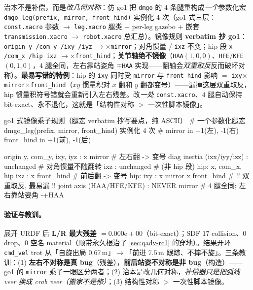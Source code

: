\begin{insight}\label{ins:qadv-leg-macro}
治本不是补偿，而是\emph{改几何对称}：仿 go1 把 \texttt{dmgo} 的 $4$ 条腿重构成\emph{一个}参数化宏 \texttt{dmgo\_leg(prefix, mirror, front\_hind)} 实例化 $4$ 次（go1 式三层：\texttt{const.xacro} 参数 $\to$ \texttt{leg.xacro} 腿类 + per-leg gazebo + 嵌套 \texttt{transmission.\allowbreak xacro} $\to$ \texttt{robot.xacro} 总汇总）。镜像规则 \textbf{verbatim 抄 go1}：\texttt{origin y /\allowbreak  com\_y /\allowbreak  ixy /\allowbreak  iyz} $\to\times$\texttt{mirror}；对角惯量 / \texttt{ixz} 不变；hip 段 \texttt{x /\allowbreak  com\_x /\allowbreak  hip ixz} $\to\times$\texttt{front\_hind}；\textbf{关节轴绝不镜像}（\texttt{HAA}$(1,0,0)$、\texttt{HFE}/\allowbreak\texttt{KFE}$(0,1,0)$，$4$ 腿全同，左右靠站姿角 $\mp$\texttt{HAA} 实现——翻轴会\emph{双重取反}反而破坏对称）。\textbf{最易写错的特例}：hip 的 \texttt{ixy} 同时受 \texttt{mirror} 与 \texttt{front\_hind} 影响 $=$ \texttt{ixy}$\times$\texttt{mirror}$\times$\texttt{front\_hind}（$xy$ 惯量积对 $x$ 翻和 $y$ 翻都变号）——漏掉这层双重取反，hip 惯量积符号错就会重新引入左右残差。改\emph{一处} \texttt{const.xacro}、$4$ 腿自动保持 bit-exact、永不退化，这就是「结构性对称 $>$ 一次性脚本镜像」。
\end{insight}

\begin{codebox}[text]{go1 式镜像乘子规则（腿宏 verbatim 抄写要点，纯 ASCII）}
# 一个参数化腿宏 dmgo_leg(prefix, mirror, front_hind) 实例化 4 次
# mirror     in {+1(左), -1(右)}   front_hind in {+1(前), -1(后)}

origin y, com_y, ixy, iyz   :  x mirror            # 左右翻 -> 变号
diag inertia (ixx/iyy/izz)  :  unchanged           # 对角惯量不随翻转
ixz                         :  unchanged           # (非 hip 段)
hip: x, com_x, hip ixz      :  x front_hind         # 前后翻 -> 变号
hip: ixy                    :  x mirror x front_hind # !! 双重取反, 最易漏 !!
joint axis (HAA/HFE/KFE)    :  NEVER mirror          # 4 腿全同; 左右靠站姿角 -+HAA
\end{codebox}

\paragraph{验证与教训。}
展开 URDF 后 \textbf{L/R 最大残差 $=0.000\mathrm{e}{+}00$}（bit-exact）；SDF $17$ collision、$0$ drop、$0$ 空名 material（顺带永久根治了 \cref{sec:qadv-rc1} 的穿地）。结果开环 \texttt{cmd\_vel} trot 从「自旋出局 $0.67$\,m」$\to$「前进 $7.5$\,m 跟踪、不摔不旋」。三条教训：(1) \textbf{左右不对称是真 bug}（残差），\textbf{前后站姿不对称是非 bug}（构造）——go1 的 \texttt{mirror} 乘子一眼区分两者；(2) 治本是改几何对称，\emph{补偿器只是把弧线 veer 换成 crab veer（搬家不是修）}；(3) 结构性对称 $>$ 一次性脚本镜像。

